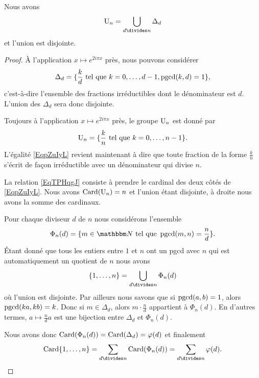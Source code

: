 \begin{lemma}       \label{LemKcpjee}
    Nous avons
    \begin{equation}        \label{EqpZuIyL}
        \gU_n=\bigcup_{d\divides n}\Delta_d
    \end{equation}
    et l'union est disjointe.
\end{lemma}

\begin{proof}
    À l'application \( x\mapsto  e^{2i\pi x}\) près, nous pouvons considérer
    \begin{equation}
        \Delta_d=\{ \frac{ k }{ d }\text{ tel que } k=0,\ldots, d-1, \operatorname{pgcd}(k,d)=1 \},
    \end{equation}
    c'est-à-dire l'ensemble des fractions irréductibles dont le dénominateur est \( d\). L'union des \( \Delta_d\) sera donc disjointe.

    Toujours à l'application \( x\mapsto  e^{2i\pi x}\) près, le groupe \( \operatorname{U}_n\) est donné par
    \begin{equation}
        \operatorname{U}_n=\{ \frac{ k }{ n }\text{ tel que } k=0,\ldots, n-1 \}.
    \end{equation}
    L'égalité \eqref{EqpZuIyL} revient maintenant à dire que toute fraction de la forme \( \frac{ k }{ n }\) s'écrit de façon irréductible avec un dénominateur qui divise \( n\).

    La relation \eqref{EqTPHqgJ} consiste à prendre le cardinal des deux côtés de \eqref{EqpZuIyL}. Nous avons \( \operatorname{Card}(\operatorname{U}_n)=n\) et l'union étant disjointe, à droite nous avons la somme des cardinaux.


    Pour chaque diviseur \( d\) de \( n\) nous considérons l'ensemble
    \begin{equation}
        \Phi_n(d)=\{ m\in \eN\tq \pgcd(m,n)=\frac{ n }{ d } \}.
    \end{equation}
    Étant donné que tous les entiers entre \( 1\) et \( n\) ont un pgcd avec \( n\) qui est automatiquement un quotient de \( n\) nous avons
    \begin{equation}
        \{ 1,\ldots, n \}=\bigcup_{d\divides n}\Phi_n(d)
    \end{equation}
    où l'union est disjointe. Par ailleurs nous savons que si \( \operatorname{pgcd}(a,b)=1\), alors \( \operatorname{pgcd}(ka,kb)=k\). Donc si \( m\in \Delta_d\), alors \( m\cdot \frac{ n }{ d }\) appartient à \( \Phi_n(d)\). En d'autres termes, \( a\mapsto \frac{ n }{ d }a\) est une bijection entre \( \Delta_d\) et \( \Phi_n(d)\).

    Nous avons donc \( \operatorname{Card}(\Phi_n(d))=\operatorname{Card}(\Delta_d)=\varphi(d)\) et finalement
    \begin{equation}
        \Card\{ 1,\ldots, n \}=\sum_{d\divides n}\Card(\Phi_n(d))=\sum_{d\divides n}\varphi(d).
    \end{equation}
\end{proof}

